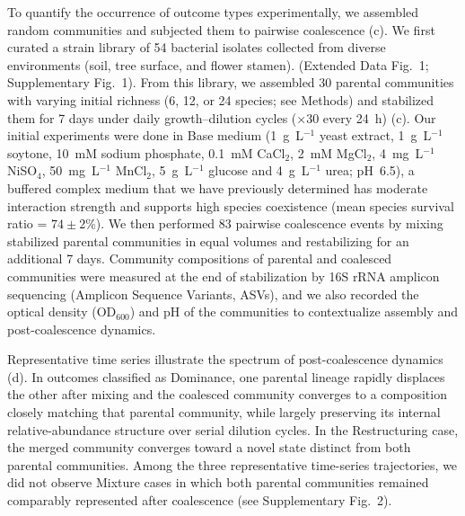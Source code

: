 To quantify the occurrence of outcome types experimentally, we assembled random  communities and subjected them to pairwise coalescence (c). We first curated a strain library of 54 bacterial isolates collected from diverse environments (soil, tree surface, and flower stamen).  (Extended Data Fig.~1; Supplementary Fig.~1). From this library, we assembled 30 parental communities with varying initial richness (6, 12, or 24 species; see Methods) and stabilized them for 7 days under daily growth--dilution cycles ($\times$30 every 24~h) (c). Our initial experiments were done in Base medium (1~g~L$^{-1}$ yeast extract, 1~g~L$^{-1}$ soytone, 10~mM sodium phosphate, 0.1~mM CaCl$_2$, 2~mM MgCl$_2$, 4~mg~L$^{-1}$ NiSO$_4$, 50~mg~L$^{-1}$ MnCl$_2$, 5~g~L$^{-1}$ glucose and 4~g~L$^{-1}$ urea; pH~6.5), a buffered complex medium that we have previously determined has moderate interaction strength and supports high species coexistence (mean species survival ratio = $74 \pm 2$\%). We then performed 83 pairwise coalescence events by mixing stabilized parental communities in equal volumes and restabilizing for an additional 7 days. Community compositions of parental and coalesced communities were measured at the end of stabilization by 16S rRNA amplicon sequencing (Amplicon Sequence Variants, ASVs), and we also recorded the optical density (OD$_{600}$) and pH of the communities to contextualize assembly and post-coalescence dynamics.

Representative time series illustrate the spectrum of post-coalescence dynamics (d). In outcomes classified as Dominance, one parental lineage rapidly displaces the other after mixing and the coalesced community converges to a composition closely matching that parental community, while largely preserving its internal relative-abundance structure over serial dilution cycles. In the Restructuring case, the merged community converges toward a novel state distinct from both parental communities. Among the three representative time-series trajectories, we did not observe Mixture cases in which both parental communities remained comparably represented after coalescence (see Supplementary Fig.~2).

